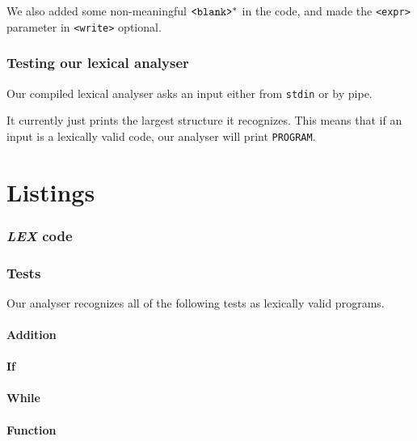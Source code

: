 \documentclass[a4paper,12pt,notitlepage,english]{article}
\begin{document}
	\noindent We also added some non-meaningful \(\verb+<blank>+^*\) in the code, and made the \verb+<expr>+ parameter in \verb+<write>+ optional.

	\section{Testing our lexical analyser}

	Our compiled lexical analyser asks an input either from \texttt{stdin} or by pipe.

	It currently just prints the largest structure it recognizes.
	This means that if an input is a lexically valid code, our analyser will print \verb+PROGRAM+.

	\newpage\appendix\part*{Listings}

	\section*{\emph{LEX} code}

	
	\newpage
	

	\section*{Tests}

	Our analyser recognizes all of the following tests as lexically valid programs.

	\subsection*{Addition}

	

	\subsection*{If}

	

	\subsection*{While}

	

	\newpage\subsection*{Function}

	
\end{document}
